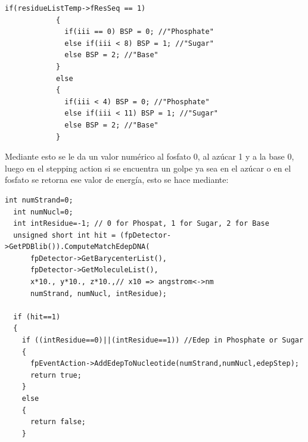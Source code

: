 \lstset {language=C++}
\begin{lstlisting}
if(residueListTemp->fResSeq == 1)
            {
              if(iii == 0) BSP = 0; //"Phosphate"
              else if(iii < 8) BSP = 1; //"Sugar"
              else BSP = 2; //"Base"
            }
            else
            {
              if(iii < 4) BSP = 0; //"Phosphate"
              else if(iii < 11) BSP = 1; //"Sugar"
              else BSP = 2; //"Base"
            }
\end{lstlisting}
Mediante esto se le da un valor numérico al fosfato 0, al azúcar 1 y a la base 0, luego en el stepping action si se encuentra un golpe ya sea en el azúcar o en el fosfato se retorna ese valor de energía, esto se hace mediante:
\lstset {language=C++}
\begin{lstlisting}
int numStrand=0;
  int numNucl=0;
  int intResidue=-1; // 0 for Phospat, 1 for Sugar, 2 for Base
  unsigned short int hit = (fpDetector->GetPDBlib()).ComputeMatchEdepDNA(
      fpDetector->GetBarycenterList(),
      fpDetector->GetMoleculeList(),
      x*10., y*10., z*10.,// x10 => angstrom<->nm
      numStrand, numNucl, intResidue);

  if (hit==1)
  {
    if ((intResidue==0)||(intResidue==1)) //Edep in Phosphate or Sugar
    {
      fpEventAction->AddEdepToNucleotide(numStrand,numNucl,edepStep);
      return true;
    }
    else
    {
      return false;
    }
    \end{lstlisting}

